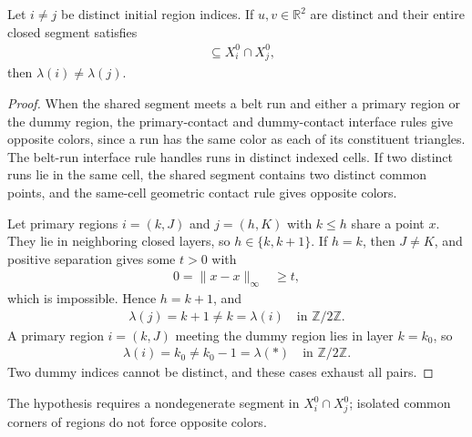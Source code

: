 \begin{lemma}
    \label{thm:area_law_initial_interface_colors}
    \leanok
    Let $i\ne j$ be distinct initial region indices. If $u,v\in\mathbb R^2$
    are distinct and their entire closed segment satisfies
    \begin{align}
        [u,v] & \subseteq X_i^0\cap X_j^0,
    \end{align}
    then $\lambda(i)\ne\lambda(j)$.
\end{lemma}
\begin{proof}\leanok
    When the shared segment meets a belt run and either a primary region or
    the dummy region, the primary-contact and dummy-contact interface rules
    give opposite colors,
    since a run has the same color as each of its constituent triangles.
    The belt-run interface rule handles runs in
    distinct indexed cells. If two distinct runs lie in the same cell, the
    shared segment contains two distinct common points, and
    the same-cell geometric contact rule gives opposite colors.

    Let primary regions $i=(k,J)$ and $j=(h,K)$ with $k\le h$ share a point
    $x$. They lie in neighboring closed layers, so $h\in\{k,k+1\}$. If
    $h=k$, then $J\ne K$, and positive separation gives some $t>0$ with
    \begin{align}
        0=\|x-x\|_\infty & \ge t,
    \end{align}
    which is impossible. Hence $h=k+1$, and
    \begin{align}
        \lambda(j)=k+1\ne k=\lambda(i)\quad\text{in }\mathbb Z/2\mathbb Z.
    \end{align}
    A primary region $i=(k,J)$ meeting the dummy region lies in layer $k=k_0$, so
    \begin{align}
        \lambda(i)=k_0\ne k_0-1=\lambda(*)\quad\text{in }\mathbb Z/2\mathbb Z.
    \end{align}
    Two dummy indices cannot be distinct, and these cases exhaust all pairs.
\end{proof}

The hypothesis requires a nondegenerate segment in $X_i^0\cap X_j^0$;
isolated common corners of regions do not force opposite colors.
